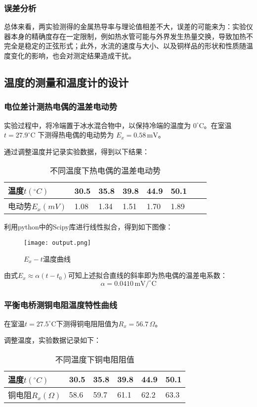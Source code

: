 \documentclass[UTF-8,twoside,cs4size]{ctexart}
\begin{document}
\subsubsection{误差分析}
总体来看，两实验测得的金属热导率与理论值相差不大，误差的可能来为：实验仪器本身的精确度存在一定限制，例如热水管可能与外界发生热量交换，导致加热不完全是稳定的正弦形式；此外，水流的速度与大小、以及铜样品的形状和性质随温度变化的影响，也会对测定结果造成干扰。

\subsection{温度的测量和温度计的设计}
\subsubsection{电位差计测热电偶的温差电动势}
实验过程中，将冷端置于冰水混合物中，以保持冷端的温度为 $0^\circ \mathrm{C}$。在室温 $t=27.9^\circ \mathrm{C}$ 下测得热电偶的电动势为 $E_x=0.58\,\mathrm{mV}$。

通过调整温度并记录实验数据，得到以下结果：

\begin{table}[!h]
    \centering
    \renewcommand\arraystretch{1.5}
	\caption{不同温度下热电偶的温差电动势}
    \begin{tabular}{|l|l|l|l|l|l|l|l|}
    \hline
        温度$t(^{\circ}C)$ & 30.5 & 35.8 & 39.8 & 44.9 & 50.1 \\ \hline
        电动势$E_x(mV)$ & 1.08 & 1.34 & 1.51 & 1.70 &1.89\\ \hline
    \end{tabular}
\end{table}
利用python中的Scipy库进行线性拟合，得到如下图像：
\begin{figure}[!h]
    \centering
    \texttt{[image: output.png]}
    \caption{$E_x - t$温度曲线}
\end{figure}

由式$ E_x\approx\alpha(t-t_0) $可知上述拟合直线的斜率即为热电偶的温差电系数：
	\[\alpha = 0.0410\,\mathrm{mV/^\circ \mathrm{C}}\]

\subsubsection{平衡电桥测铜电阻温度特性曲线}
在室温$ t=27.5^\circ \mathrm{C}$下测得铜电阻阻值为$ R_x=56.7\,\Omega $。
	
调整温度，实验数据记录如下：
\begin{table}[!h]
    \centering
    \renewcommand\arraystretch{1.5}
	\caption{不同温度下铜电阻阻值}
    \begin{tabular}{|l|l|l|l|l|l|}
    \hline
        温度$t(^{\circ}C)$ & 30.5 & 35.8 & 39.8 & 44.9 & 50.1 \\ \hline
        铜电阻$R_x(\Omega)$ & 58.6 & 59.7 & 61.1 & 62.2 & 63.3 \\ \hline
    \end{tabular}
\end{table}	
\end{document}
